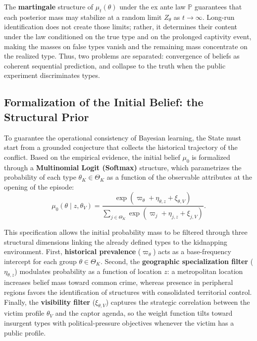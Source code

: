 \documentclass[12pt,a4paper]{article}
\theoremstyle{plain}
\theoremstyle{definition}
\theoremstyle{remark}
\newcommand{\ProbE}{\mathbb{P}}
\newcommand{\1}{\mathbf{1}}
\begin{document}
The \textbf{martingale} structure of $\mu_t(\theta)$ under the ex ante law $\ProbE$
guarantees that each posterior mass may stabilize at a random limit $Z_\theta$ as
$t\to\infty$. Long-run identification does not create those limits; rather, it
determines their content under the law conditioned on the true type and on the
prolonged captivity event, making the masses on false types vanish and the remaining
mass concentrate on the realized type. Thus, two problems are separated: convergence of
beliefs as coherent sequential prediction, and collapse to the truth when the public
experiment discriminates types.

\subsection{Formalization of the Initial Belief: the Structural Prior}
\label{subsec:prior-estructural}

To guarantee the operational consistency of Bayesian learning, the State must start
from a grounded conjecture that collects the historical trajectory of the conflict.
Based on the empirical evidence, the initial belief $\mu_0$ is formalized through a
\textbf{Multinomial Logit (Softmax)} structure, which parametrizes the probability of
each type $\theta_K\in\Theta_K$ as a function of the observable attributes at the
opening of the episode:
\begin{equation}
\label{eq:prior-initial-softmax}
\mu_0(\theta \mid z, \theta_V) =
\frac{\exp\left( \varpi_\theta + \eta_{\theta,z} + \xi_{\theta,V} \right)}
{\sum_{j \in \Theta_K} \exp\left( \varpi_j + \eta_{j,z} + \xi_{j,V} \right)}.
\end{equation}

This specification allows the initial probability mass to be filtered through three
structural dimensions linking the already defined types to the kidnapping environment.
First, \textbf{historical prevalence} ($\varpi_\theta$) acts as a base-frequency
intercept for each group $\theta\in\Theta_K$. Second, the \textbf{geographic
specialization filter} ($\eta_{\theta,z}$) modulates probability as a function of
location $z$: a metropolitan location increases belief mass toward common crime,
whereas presence in peripheral regions favors the identification of structures with
consolidated territorial control. Finally, the \textbf{visibility filter}
($\xi_{\theta,V}$) captures the strategic correlation between the victim profile
$\theta_V$ and the captor agenda, so the weight function tilts toward insurgent types
with political-pressure objectives whenever the victim has a public profile.
\end{document}
